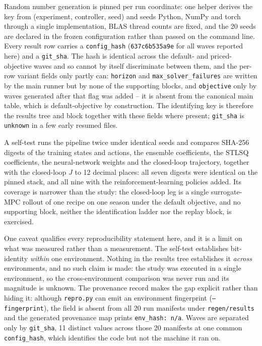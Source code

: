 Random number generation is pinned per run coordinate: one helper derives the key from
(experiment, controller, seed) and seeds Python, NumPy and torch through a single
implementation, BLAS thread counts are fixed, and the 20 seeds are declared in the frozen
configuration rather than passed on the command line. Every result row carries a
\texttt{config\_hash} (\texttt{637c6b535a9e} for all waves reported here) and a
\texttt{git\_sha}. The hash is identical across the default- and priced-objective waves and
so cannot by itself discriminate between them, and the per-row variant fields only partly
can: \texttt{horizon} and \texttt{max\_solver\_failures} are written by the main runner but
by none of the supporting blocks, and \texttt{objective} only by waves generated after that
flag was added -- it is absent from the canonical main table, which is default-objective by
construction. The identifying key is therefore the results tree and block together with
these fields where present; \texttt{git\_sha} is \texttt{unknown} in a few early resumed
files.

A self-test runs the pipeline twice under identical seeds and compares SHA-256 digests of
the training states and actions, the ensemble coefficients, the STLSQ coefficients, the
neural-network weights and the closed-loop trajectory, together with the closed-loop $J$ to
12 decimal places: all seven digests were identical on the pinned stack, and all nine
with the reinforcement-learning policies added. Its coverage is narrower than the study:
the closed-loop leg is a single surrogate-MPC rollout of one recipe on one season under the
default objective, and no supporting block, neither the identification ladder nor the
replay block, is exercised.

One caveat qualifies every reproducibility statement here, and it is a limit on what was
measured rather than a measurement. The self-test establishes bit-identity \emph{within}
one environment. Nothing in the results tree establishes it \emph{across} environments,
and no such claim is made: the study was executed in a single environment, so the
cross-environment comparison was never run and its magnitude is unknown.
The provenance record makes the gap explicit rather than hiding it: although
\texttt{repro.py} can emit an environment fingerprint (\texttt{--fingerprint}), the field
is absent from all 20 run manifests under \texttt{regen/results} and the generated
provenance map prints \texttt{env\_hash:\ n/a}. Waves are separated only by
\texttt{git\_sha}, 11 distinct values across those 20 manifests at one common \texttt{config\_hash}, which identifies the code but not the machine it ran on.

